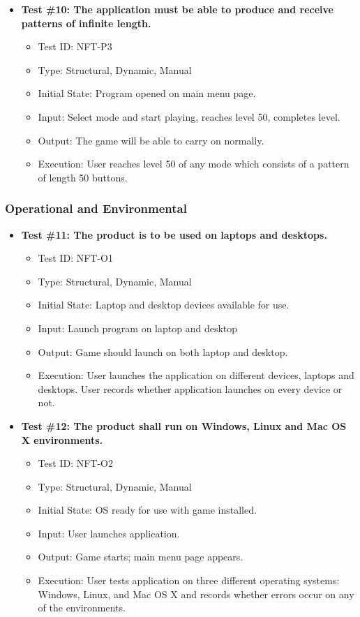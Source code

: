 \documentclass[12pt, titlepage]{article}
\begin{document}
\begin{itemize}
\item \textbf{Test \#10: The application must be able to produce and receive patterns of infinite length.}
\begin{itemize}
\item Test ID: NFT-P3
\item Type: Structural, Dynamic, Manual				
\item Initial State: Program opened on main menu page.		
\item Input: Select mode and start playing, reaches level 50, completes level.
\item Output: The game will be able to carry on normally.
\item Execution: User reaches level 50 of any mode which consists of a pattern of length 50 buttons.
\end{itemize}
\end{itemize}

\subsubsection{Operational and Environmental}
\begin{itemize}
\item \textbf{Test \#11: The product is to be used on laptops and desktops.}
\begin{itemize}
\item Test ID: NFT-O1
\item Type: Structural, Dynamic, Manual				
\item Initial State: Laptop and desktop devices available for use.		
\item Input: Launch program on laptop and desktop
\item Output: Game should launch on both laptop and desktop.		
\item Execution: User launches the application on different devices, laptops and desktops. User records whether application launches on every device or not.
\end{itemize}

\item \textbf{Test \#12: The product shall run on Windows, Linux and Mac OS X environments.}
\begin{itemize}
\item Test ID: NFT-O2
\item Type: Structural, Dynamic, Manual			
\item Initial State: OS ready for use with game installed.		
\item Input: User launches application.			
\item Output: Game starts; main menu page appears.				
\item Execution: User tests application on three different operating systems: Windows, Linux, and Mac OS X and records whether errors occur on any of the environments.
\end{itemize}
\end{itemize}
\end{document}
